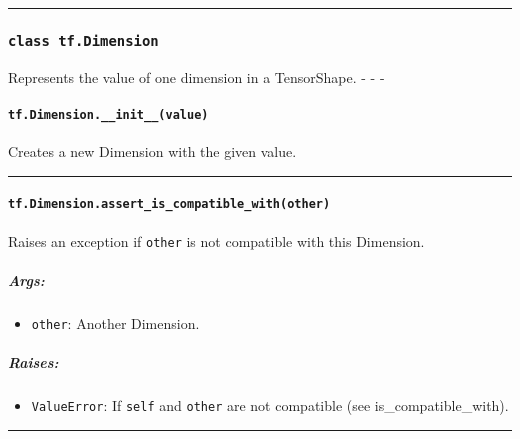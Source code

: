 \begin{center}\rule{0.5\linewidth}{\linethickness}\end{center}

\subsubsection{\texorpdfstring{\lstinline{class tf.Dimension}
}{class tf.Dimension }}\label{class-tf.dimension}

Represents the value of one dimension in a TensorShape. - - -

\paragraph{\texorpdfstring{\lstinline{tf.Dimension.__init__(value)}
}{tf.Dimension.__init__(value) }}\label{tf.dimension.ux5fux5finitux5fux5fvalue}

Creates a new Dimension with the given value.

\begin{center}\rule{0.5\linewidth}{\linethickness}\end{center}

\paragraph{\texorpdfstring{\lstinline{tf.Dimension.assert_is_compatible_with(other)}
}{tf.Dimension.assert_is_compatible_with(other) }}\label{tf.dimension.assertux5fisux5fcompatibleux5fwithother}

Raises an exception if \lstinline{other} is not compatible with this
Dimension.

\subparagraph{Args: }\label{args-40}

\begin{itemize}
\tightlist
\item
  \lstinline{other}: Another Dimension.
\end{itemize}

\subparagraph{Raises: }\label{raises-25}

\begin{itemize}
\tightlist
\item
  \lstinline{ValueError}: If \lstinline{self} and \lstinline{other} are not
  compatible (see is_compatible_with).
\end{itemize}

\begin{center}\rule{0.5\linewidth}{\linethickness}\end{center}

